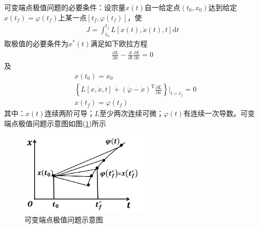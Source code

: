             \par
            可变端点极值问题的必要条件：设宗量$x(t)$自一给定点$(t_0,x_0)$达到给定$x(t_f) = \varphi(t_f)$上某一点$[t_f,\varphi(t_f)]$，使
            \begin{align*}
            J = \int_{t_0}^{t_f} L[x(t),\dot{x}(t),t]\mathrm{d}t
            \end{align*}
            取极值的必要条件为$x^*(t)$满足如下欧拉方程
            \begin{align*}
            \frac{\partial L}{\partial x} - \frac{\mathrm{d} }{\partial t}\frac{\partial L}{\partial \dot{x}} = 0
            \end{align*}
            及
            \begin{align*}
            & x(t_0) = x_0\\
            & \left\{L[x,\dot{x},t]+(\dot{\varphi}-\dot{x})^\mathrm{T}\frac{\partial L}{\partial \dot{x}}  \right\}\Big|_{t=t_f}=0\\
            & x(t_f) = \varphi(t_f)
            \end{align*}
            其中：$x(t)$连续两阶可导；$L$至少两次连续可微；$\varphi(t)$有连续一次导数。可变端点极值问题示意图如图(\ref{fig:可变端点极值问题示意图})所示
            \begin{figure}[H]
            \centering
            \includegraphics[height=4cm]{images/Variable_Extreme_Extreme_Value_Problem.jpg}
            \caption{可变端点极值问题示意图}
            \label{fig:可变端点极值问题示意图}
            \end{figure}
